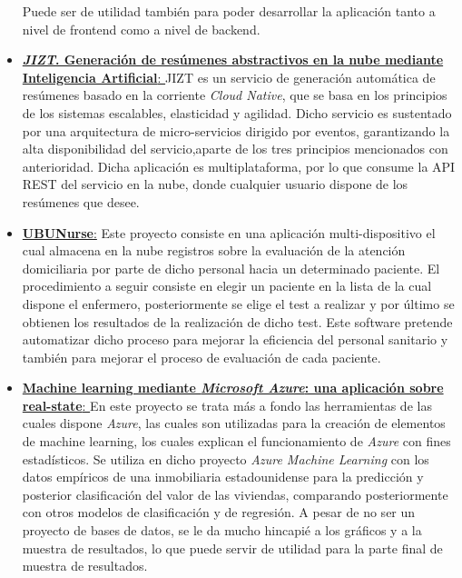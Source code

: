 \begin{itemize}
    Puede ser de utilidad también para poder desarrollar la aplicación tanto a nivel de frontend como a nivel de backend.
    \item \href{https://raw.githubusercontent.com/dmlls/jizt/doc/tex/docs/latex/memoria.pdf}{\textbf{\textit{JIZT}. Generación de resúmenes abstractivos en la nube mediante Inteligencia Artificial}: }
    JIZT es un servicio de generación automática de resúmenes basado en la corriente \textit{Cloud Native}, que se basa en los principios de los sistemas escalables, elasticidad y agilidad.
    Dicho servicio es sustentado por una arquitectura de micro-servicios dirigido por eventos, garantizando la alta disponibilidad del servicio,aparte de los tres principios mencionados con anterioridad.
    Dicha aplicación es multiplataforma, por lo que consume la API REST del servicio en la nube, donde cualquier usuario dispone de los resúmenes que desee.
    \item \href{https://www.ubunurse.com/}{\textbf{UBUNurse}:} Este proyecto consiste en una aplicación multi-dispositivo el cual almacena en la nube registros sobre la evaluación de la atención domiciliaria por parte de dicho personal
    hacia un determinado paciente. El procedimiento a seguir consiste en elegir un paciente en la lista de la cual dispone el enfermero, posteriormente se elige el test a realizar y por último se obtienen los resultados de la realización
    de dicho test. Este software pretende automatizar dicho proceso para mejorar la eficiencia del personal sanitario y también para mejorar el proceso de evaluación de cada paciente.
    
    \item \href{https://upcommons.upc.edu/handle/2117/346372}{\textbf{Machine learning mediante \textit{Microsoft Azure}: una aplicación sobre real-state}: } 
    En este proyecto se trata más a fondo las herramientas de las cuales dispone \textit{Azure}, las cuales son utilizadas para 
    la creación de elementos de machine learning, los cuales explican el funcionamiento de \textit{Azure} con fines estadísticos. 
    Se utiliza en dicho proyecto \textit{Azure Machine Learning} con los datos empíricos de una inmobiliaria estadounidense para la predicción y posterior clasificación del valor de las viviendas, comparando posteriormente con otros 
    modelos de clasificación y de regresión. A pesar de no ser un proyecto de bases de datos, se le da mucho hincapié a los gráficos y a la muestra
    de resultados, lo que puede servir de utilidad para la parte final de muestra de resultados.
    

\end{itemize}

